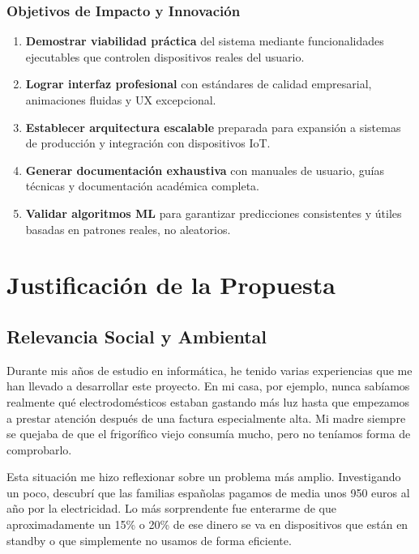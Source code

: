 \documentclass[12pt,a4paper,spanish]{article}
\begin{document}
\subsubsection{Objetivos de Impacto y Innovación}

\begin{enumerate}[resume]
    \item \textbf{Demostrar viabilidad práctica} del sistema mediante funcionalidades ejecutables que controlen dispositivos reales del usuario.

    \item \textbf{Lograr interfaz profesional} con estándares de calidad empresarial, animaciones fluidas y UX excepcional.

    \item \textbf{Establecer arquitectura escalable} preparada para expansión a sistemas de producción y integración con dispositivos IoT.

    \item \textbf{Generar documentación exhaustiva} con manuales de usuario, guías técnicas y documentación académica completa.

    \item \textbf{Validar algoritmos ML} para garantizar predicciones consistentes y útiles basadas en patrones reales, no aleatorios.
\end{enumerate}

\section{Justificación de la Propuesta}

\subsection{Relevancia Social y Ambiental}

Durante mis años de estudio en informática, he tenido varias experiencias que me han llevado a desarrollar este proyecto. En mi casa, por ejemplo, nunca sabíamos realmente qué electrodomésticos estaban gastando más luz hasta que empezamos a prestar atención después de una factura especialmente alta. Mi madre siempre se quejaba de que el frigorífico viejo consumía mucho, pero no teníamos forma de comprobarlo.

Esta situación me hizo reflexionar sobre un problema más amplio. Investigando un poco, descubrí que las familias españolas pagamos de media unos 950 euros al año por la electricidad. Lo más sorprendente fue enterarme de que aproximadamente un 15\% o 20\% de ese dinero se va en dispositivos que están en standby o que simplemente no usamos de forma eficiente.
\end{document}
